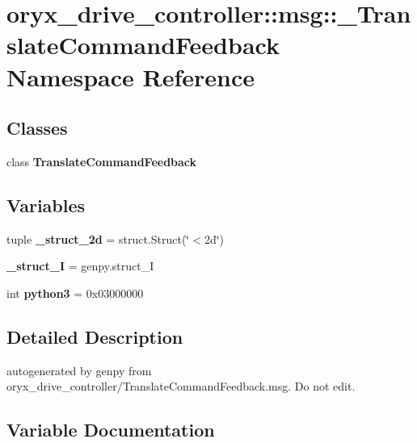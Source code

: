 \section{oryx\-\_\-drive\-\_\-controller\-:\-:msg\-:\-:\-\_\-\-Translate\-Command\-Feedback \-Namespace \-Reference}
\label{namespaceoryx__drive__controller_1_1msg_1_1__TranslateCommandFeedback}
\subsection*{\-Classes}
\begin{DoxyCompactItemize}
\item 
class {\bf \-Translate\-Command\-Feedback}
\end{DoxyCompactItemize}
\subsection*{\-Variables}
\begin{DoxyCompactItemize}
\item 
tuple {\bf \-\_\-struct\-\_\-2d} = struct.\-Struct(\char`\"{}$<$2d\char`\"{})
\item 
{\bf \-\_\-struct\-\_\-\-I} = genpy.\-struct\-\_\-\-I
\item 
int {\bf python3} = 0x03000000
\end{DoxyCompactItemize}


\subsection{\-Detailed \-Description}
\begin{DoxyVerb}autogenerated by genpy from oryx_drive_controller/TranslateCommandFeedback.msg. Do not edit.\end{DoxyVerb}
 

\subsection{\-Variable \-Documentation}
